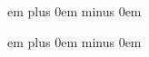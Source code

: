 \newskip\interwordspacetextnotes

\newskip\interwordspacetext

\newskip\bispace

\newskip\trispace

\newskip\punctuminclinatumshift

\newskip\beforepunctainclinatashift

\newskip\punctuminclinatumanddebilisshift

\newskip\punctuminclinatumdebilisshift

\newskip\spacebeforesmallbar

\newskip\spaceaftersmallbar

\newskip\spacebeforeminor

\newskip\spaceafterminor

\newskip\spacebeforemaior

\newskip\spaceaftermaior

\newskip\spacebeforefinalis

\newskip\spacebeforefinalfinalis

\newskip\spaceafterfinalis

\newskip\textbartextspace

\newskip\notebarspace

\newdimen\maximumspacewithoutdash

\newskip\afterinitialshift
{} em plus 0em minus 0em

\newskip\beforeinitialshift
{} em plus 0em minus 0em

\def\setspaceafterinitial#1{%
\afterinitialshift=#1 %
\relax %
}

\def\setspacebeforeinitial#1{%
\beforeinitialshift=#1 %
\relax %
}

